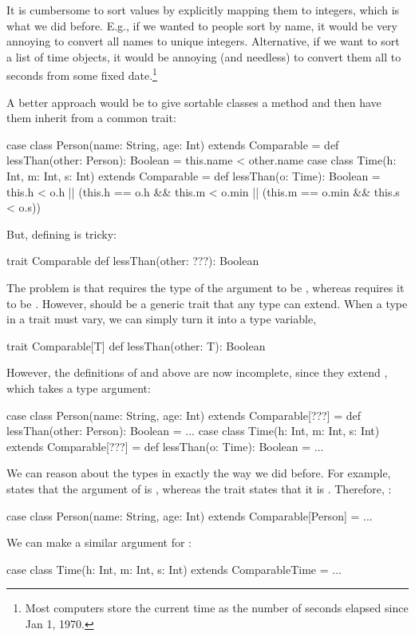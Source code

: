 \documentclass{book}
\begin{document}
It is cumbersome to sort values by explicitly mapping them to integers,
which is what we did before.
E.g., if we wanted to people sort by name, it would be very annoying to convert
all names to unique integers. Alternative, if we want to sort a list of time
objects, it would be annoying (and needless) to convert them all to seconds
from some fixed date.\footnote{Most computers store the current time as the number of seconds elapsed since Jan 1, 1970.}

A better approach would be to give sortable classes a  method
and then have them inherit from a common trait:
\begin{scalacode}
case class Person(name: String, age: Int) extends Comparable = {
  def lessThan(other: Person): Boolean = this.name < other.name
}
case class Time(h: Int, m: Int, s: Int) extends Comparable = {
  def lessThan(o: Time): Boolean = this.h < o.h || (this.h == o.h && this.m < o.min || (this.m == o.min && this.s < o.s))
}
\end{scalacode}
But, defining  is tricky:
\begin{scalacode}
trait Comparable {
  def lessThan(other: ???): Boolean
}
\end{scalacode}
The problem is that  requires the type of the argument
to be , whereas  requires it to be .
However,  should be a generic trait that any type can extend.
When a type in a trait must vary, we can simply turn it into a type variable,
\begin{scalacode}
trait Comparable[T] {
  def lessThan(other: T): Boolean
}
\end{scalacode}
However, the definitions of  and 
above are now incomplete, since they extend , which
takes a type argument:
\begin{scalacode}
case class Person(name: String, age: Int) extends Comparable[???] = {
  def lessThan(other: Person): Boolean = ...
}
case class Time(h: Int, m: Int, s: Int) extends Comparable[???] = {
  def lessThan(o: Time): Boolean = ...
}
\end{scalacode}
We can reason about the types in exactly the way we did before.
For example,  states that the argument of 
is , whereas the trait states that it is .
Therefore, :
\begin{scalacode}
case class Person(name: String, age: Int) extends Comparable[Person] = ...
\end{scalacode}
We can make a similar argument for :
\begin{scalacode}
case class Time(h: Int, m: Int, s: Int) extends ComparableTime = ...
\end{scalacode}
\end{document}
